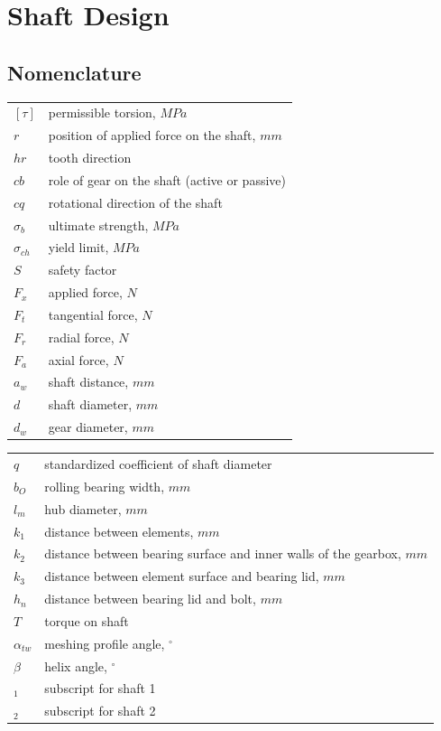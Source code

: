 \chapter{Shaft Design}
\section{Nomenclature}
\begin{tabular}[t]{lp{7cm}}
	$ [\tau] $ & permissible torsion, $ \unit{MPa} $\\
	$ r $ & position of applied force on the shaft, $\unit{mm}$\\
	$ hr $ & tooth direction\\
	$ cb $ & role of gear on the shaft (active or passive)\\
	$ cq $ & rotational direction of the shaft\\
	$ \sigma_b $ & ultimate strength, $ \unit{MPa} $\\
	$ \sigma_{ch} $ & yield limit, $ \unit{MPa} $\\
	$ S $ & safety factor\\
	$ F_x $ & applied force, $ \unit{N} $\\
	$ F_t $ & tangential force, $ \unit{N} $\\
	$ F_r $ & radial force, $ \unit{N} $\\
	$ F_a $ & axial force, $ \unit{N} $\\
	$ a_w $ & shaft distance, $ \unit{mm} $\\
	$ d $ & shaft diameter, $ \unit{mm} $\\
	$ d_w $ & gear diameter, $ \unit{mm} $\\
	
\end{tabular}
\begin{tabular}[t]{lp{7cm}}
	$ q $ & standardized coefficient of shaft diameter\\
	$ b_O $ & rolling bearing width, $ \unit{mm} $\\
	$ l_m $ & hub diameter, $ \unit{mm} $\\
	$ k_1 $ & distance between elements, $ \unit{mm} $\\
	$ k_2 $ & distance between bearing surface and inner walls of the gearbox, $ \unit{mm} $\\
	$ k_3 $ & distance between element surface and bearing lid, $ \unit{mm} $\\
	$ h_n $ & distance between bearing lid and bolt, $ \unit{mm} $\\
	$ T $ & torque on shaft\\
	$ \alpha_{tw} $ & meshing profile angle, $ ^\circ $\\
	$ \beta $ & helix angle, $ ^\circ $\\
	$ _1 $ & subscript for shaft 1\\
	$ _2 $ & subscript for shaft 2\\
\end{tabular}
